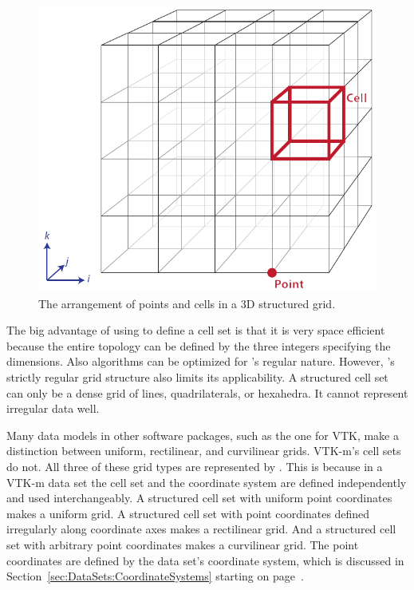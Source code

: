 \begin{figure}
  \centering
  \includegraphics{images/StructuredCellSet}
  \caption{The arrangement of points and cells in a 3D structured grid.}
  \label{fig:CellSetStructured}
\end{figure}

The big advantage of using  to define a cell
set is that it is very space efficient because the entire topology can be
defined by the three integers specifying the dimensions. Also algorithms
can be optimized for 's regular nature.
However, 's strictly regular grid
structure also limits its applicability. A structured cell set can only be
a dense grid of lines, quadrilaterals, or hexahedra. It cannot represent
irregular data well.

Many data models in other software packages, such as the one for VTK, make
a distinction between uniform, rectilinear, and curvilinear grids. VTK-m's
cell sets do not. All three of these grid types are represented by
. This is because in a VTK-m data set the
cell set and the coordinate system are defined independently and used
interchangeably. A structured cell set with uniform point coordinates makes
a uniform grid. A structured cell set with point coordinates defined
irregularly along coordinate axes makes a rectilinear grid. And a
structured cell set with arbitrary point coordinates makes a curvilinear
grid. The point coordinates are defined by the data set's coordinate system,
which is discussed in Section~\ref{sec:DataSets:CoordinateSystems} starting
on page~\pageref{sec:DataSets:CoordinateSystems}.

